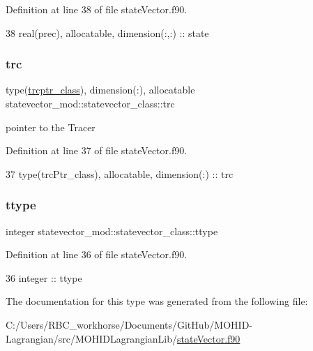 Definition at line 38 of file state\+Vector.\+f90.


\begin{DoxyCode}
38         \textcolor{keywordtype}{real(prec)}, \textcolor{keywordtype}{allocatable}, \textcolor{keywordtype}{dimension(:,:)} :: state
\end{DoxyCode}
\mbox{\label{structstatevector__mod_1_1statevector__class_a510497a5645951832de30b8fd89a1d33}} 
\subsubsection{\texorpdfstring{trc}{trc}}
{\footnotesize\ttfamily type(\mbox{\hyperlink{structstatevector__mod_1_1trcptr__class}{trcptr\+\_\+class}}), dimension(\+:), allocatable statevector\+\_\+mod\+::statevector\+\_\+class\+::trc\hspace{0.3cm}{\ttfamily [private]}}



pointer to the Tracer 



Definition at line 37 of file state\+Vector.\+f90.


\begin{DoxyCode}
37         \textcolor{keywordtype}{type}(trcPtr\_class), \textcolor{keywordtype}{allocatable}, \textcolor{keywordtype}{dimension(:)} :: trc
\end{DoxyCode}
\mbox{\label{structstatevector__mod_1_1statevector__class_a01e7628eb9959749a93b74a5bb21754c}} 
\subsubsection{\texorpdfstring{ttype}{ttype}}
{\footnotesize\ttfamily integer statevector\+\_\+mod\+::statevector\+\_\+class\+::ttype\hspace{0.3cm}{\ttfamily [private]}}



Definition at line 36 of file state\+Vector.\+f90.


\begin{DoxyCode}
36         \textcolor{keywordtype}{integer} :: ttype
\end{DoxyCode}


The documentation for this type was generated from the following file\+:\begin{DoxyCompactItemize}
\item 
C\+:/\+Users/\+R\+B\+C\+\_\+workhorse/\+Documents/\+Git\+Hub/\+M\+O\+H\+I\+D-\/\+Lagrangian/src/\+M\+O\+H\+I\+D\+Lagrangian\+Lib/\mbox{\hyperlink{state_vector_8f90}{state\+Vector.\+f90}}\end{DoxyCompactItemize}
